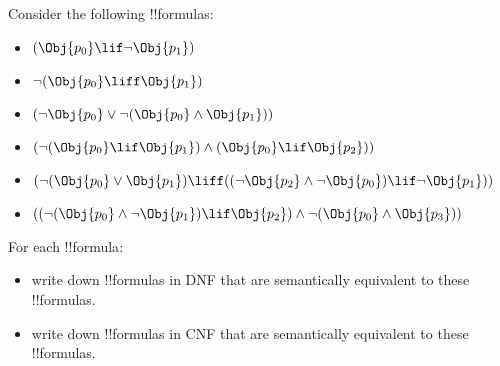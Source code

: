 \documentclass[../../../include/open-logic-section]{subfiles}
\begin{document}
\begin{prob}
Consider the following !!{formula}s:
	\begin{itemize}
		\item $( \Obj{p_0} \lif \lnot \Obj{p_1} )$
		\item $\lnot ( \Obj{p_0} \liff \Obj{p_1} )$
		\item $(\lnot  \Obj{p_0} \lor \lnot ( \Obj{p_0} \land \Obj{p_1} ))$
		\item $(\lnot ( \Obj{p_0} \lif \Obj{p_1}  ) \land ( \Obj{p_0} \lif \Obj{p_2} ))$
		\item $(\lnot ( \Obj{p_0} \lor \Obj{p_1} ) \liff ((\lnot \Obj{p_2} \land \lnot \Obj{p_0} ) \lif \lnot \Obj{p_1} ))$
		\item $((\lnot ( \Obj{p_0} \land \lnot \Obj{p_1} ) \lif \Obj{p_2} ) \land \lnot ( \Obj{p_0} \land \Obj{p_3} ))$
	\end{itemize}
For each !!{formula}:
	\begin{itemize}
		\item write down !!{formula}s in DNF that are semantically equivalent to these !!{formula}s.
		\item write down !!{formula}s in CNF that are semantically equivalent to these !!{formula}s. 
	\end{itemize}
\end{prob}
\end{document}

